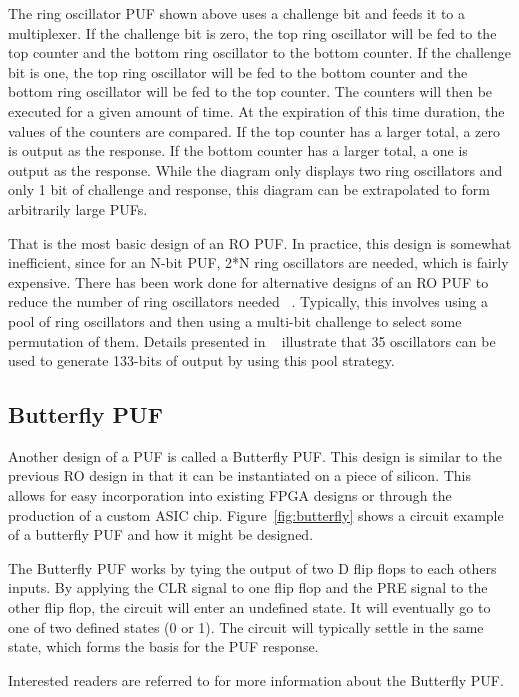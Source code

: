 The ring oscillator PUF shown above uses a challenge bit and feeds it to a multiplexer.
If the challenge bit is zero, the top ring oscillator will be fed to the top counter and
the bottom ring oscillator to the bottom counter. If the challenge bit is one, the top
ring oscillator will be fed to the bottom counter and the bottom ring oscillator will
be fed to the top counter. The counters will then be executed for a given amount of time.
At the expiration of this time duration, the values of the counters are compared. If the
top counter has a larger total, a zero is output as the response. If the bottom counter
has a larger total, a one is output as the response. 
While the diagram only displays two ring oscillators and only 1 bit of challenge and
response, this diagram can be extrapolated to form arbitrarily large PUFs.

That is the most basic design of an RO PUF. In practice, this design is somewhat 
inefficient, since for an N-bit PUF, 2*N ring oscillators are needed, which is fairly
expensive. There has been work done for alternative designs of
an RO PUF to reduce the number of ring oscillators needed ~\cite{aegis_pool}. 
Typically, this involves using
a pool of ring oscillators and then using a multi-bit challenge to select some permutation
of them. Details presented in ~\cite{aegis_pool} illustrate that 35 oscillators can
be used to generate 133-bits of output by using this pool strategy.

\subsection{Butterfly PUF}
Another design of a PUF is called a Butterfly PUF. This design is similar to the previous
RO design in that it can be instantiated on a piece of silicon. This allows for easy
incorporation into existing FPGA designs or through the production of a custom ASIC chip.
Figure~\ref{fig:butterfly} shows a circuit example of a butterfly PUF and how it might be
designed.

The Butterfly PUF works by tying the output of two D flip flops to each others inputs. By applying
the CLR signal to one flip flop and the PRE signal to the other flip flop, the circuit will enter an
undefined state. It will eventually go to one of two defined states (0 or 1). The circuit will typically
settle in the same state, which forms the basis for the PUF response.

Interested readers are referred to \cite{butterflypuf} for more information about the Butterfly PUF.

